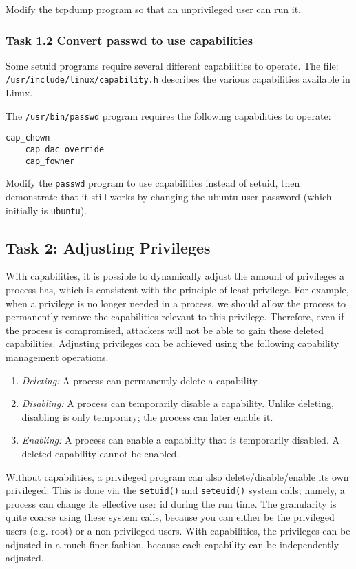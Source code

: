 Modify the tcpdump program so that an unprivileged user can run it.

\subsubsection{Task 1.2 Convert passwd to use capabilities}
Some setuid programs require several different capabilities
to operate.  The file: {\tt /usr/include/linux/capability.h} %
describes the various capabilities available in Linux.

The \texttt{/usr/bin/passwd} program requires the following
capabilities to operate:

\begin{Verbatim}[frame=single] 
    cap_chown
    cap_dac_override
    cap_fowner
\end{Verbatim}

Modify the \texttt{passwd} program to use capabilities instead of setuid,
then demonstrate that it still works by changing the ubuntu user password
(which initially is \texttt{ubuntu}).




\subsection{Task 2: Adjusting Privileges}

With capabilities, it is possible to dynamically adjust the amount of privileges  
a process has, which is consistent with the principle of least privilege.
For example, when a privilege is no longer needed in a process,
we should allow the process to permanently remove the capabilities
relevant to this privilege. Therefore,
even if the process is compromised, attackers will not be able to
gain these deleted capabilities.
Adjusting privileges can be achieved using the following
capability management operations.
\begin{enumerate}
  \item {\em Deleting:}  A process can permanently delete a capability.
  \item {\em Disabling:} A process can temporarily disable a capability.
        Unlike deleting, disabling is only temporary; the process
        can later enable it.
  \item {\em Enabling:} A process can enable a capability that is temporarily disabled.
        A deleted capability cannot be enabled.
\end{enumerate}

Without capabilities, a privileged \setuid program can also
delete/disable/enable its own privileged. This is done via
the {\tt setuid()} and {\tt seteuid()} system calls; namely, a process
can change its effective user id during the run time. The
granularity is quite coarse using these system calls, because you can either
be the privileged users (e.g. root) or a non-privileged users.
With capabilities, the privileges can be adjusted in a much
finer fashion, because each capability can be independently adjusted.

